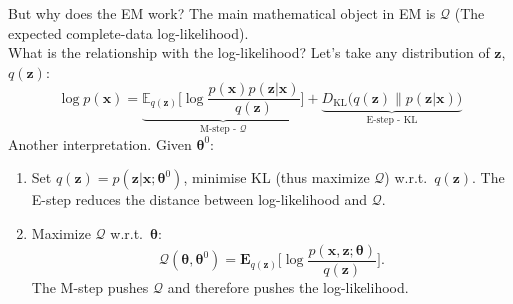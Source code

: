 \documentclass[aspectratio=169]{beamer}
\newcommand{\bs}[1]{\boldsymbol{#1}}
\begin{document}
\begin{frame}{But why does the EM work?}
 The main mathematical object in EM is $\mathcal{Q}$ {\footnotesize (The expected complete-data log-likelihood)}.\vspace{4mm}\\

 What is the relationship with the log-likelihood? Let's take any distribution of $\bs{z}$, $q(\bs{z})$:
\begin{equation*}
 \log p(\bs{x}) = \underbrace{\mathbb{E}_{q(\bs{z})}\Big[\log \frac{p(\bs{x})p(\bs{z}|\bs{x})}{q(\bs{z})}\Big]}_{\text{M-step - }\mathcal{Q}} +  \underbrace{D_{\text{KL}}\Big(q(\bs{z})\Big\lVert p(\bs{z}|\bs{x})\Big)}_{\text{E-step - KL}}
\end{equation*}\pause
%
%
Another interpretation. Given $\bs{\theta}^0$:
\begin{enumerate}
 \item Set $q(\bs{z})=p(\bs{z}|\bs{x};\bs{\theta}^0)$, minimise KL (thus maximize $\mathcal{Q}$) w.r.t.\ $q(\bs{z})$. The E-step reduces the distance between log-likelihood and $\mathcal{Q}$.
 \item Maximize $\mathcal{Q}$ w.r.t.\ $\bs{\theta}$:\vspace{-3mm}
 \[ \mathcal{Q}(\bs{\theta},\bs{\theta}^0) = \mathbf{E}_{q(\bs{z})} \Big[\log \frac{p(\bs{x},\bs{z};\bs{\theta})}{q(\bs{z})}\Big].\]
 The M-step pushes $\mathcal{Q}$ and therefore pushes the log-likelihood.
\end{enumerate}
\end{frame}
\end{document}
